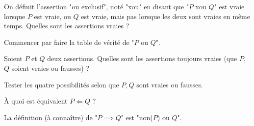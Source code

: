 \begin{question}

On définit l'assertion "ou exclusif", noté "xou" en disant que "$P$ xou $Q$" est vraie lorsque $P$ est vraie, ou $Q$ est vraie, mais pas lorsque les deux sont vraies en même temps. Quelles sont les assertions vraies ?
\begin{answers}

    

\end{answers}
\begin{explanations}
Commencer par faire la table de vérité de "$P$ ou $Q$".
\end{explanations}
\end{question}


\begin{question}

Soient $P$ et $Q$ deux assertions. Quelles sont les assertions toujours vraies (que $P$, $Q$ soient vraies ou fausses)  ?
\begin{answers}



\end{answers}
\begin{explanations}
Tester les quatre possibilités selon que $P,Q$ sont vraies ou fausses.
\end{explanations}
\end{question}


\begin{question}

À quoi est équivalent $P \Longleftarrow Q$ ?
\begin{answers}  

      

\end{answers}
\begin{explanations}
La définition (à connaître) de "$P \implies Q$" est "non($P$) ou $Q$".
\end{explanations}
\end{question}


